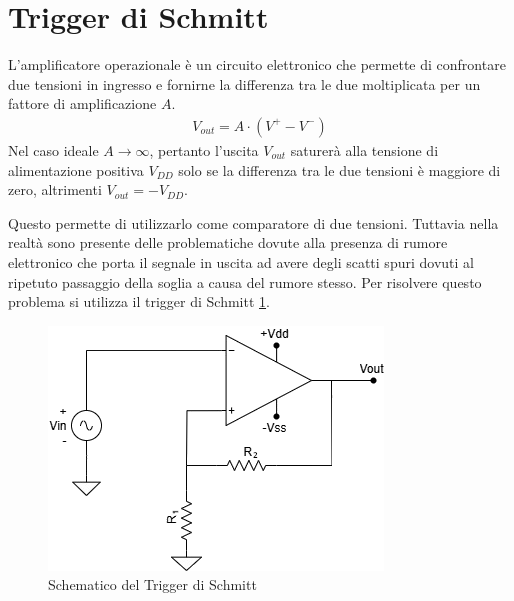 \documentclass[a4paper,12pt]{article}
\begin{document}


\section*{Trigger di Schmitt}
L'amplificatore operazionale è un circuito elettronico che permette di confrontare due tensioni in ingresso e fornirne la differenza tra le due moltiplicata per un fattore di amplificazione $A$.
\begin{align*}
	V_{out} = A \cdot (V^+ - V^-)
\end{align*}
Nel caso ideale $ A \rightarrow \infty $, pertanto l'uscita $V_{out}$ saturerà alla tensione di alimentazione positiva $V_{DD}$ solo se la differenza tra le due tensioni è maggiore di zero, altrimenti $V_{out} = -V_{DD}$.

Questo permette di utilizzarlo come comparatore di due tensioni. Tuttavia nella realtà sono presente delle problematiche dovute alla presenza di rumore elettronico che porta il segnale in uscita ad avere degli scatti spuri dovuti al ripetuto passaggio della soglia a causa del rumore stesso.
Per risolvere questo problema si utilizza il trigger di Schmitt \ref{fig:trigger_schmitt}.

\begin{figure}[h]
	\centering
	\includegraphics[width = 0.55\linewidth]{./immagini/schmitt/circuito.png}
	\caption{Schematico del Trigger di Schmitt}
	\label{fig:trigger_schmitt}
\end{figure}
\end{document}
